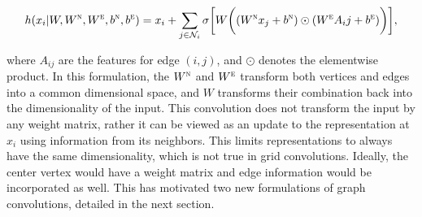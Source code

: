 \begin{equation}
h(x_i | W, W^\textsc{n}, W^\textsc{e}, b^\textsc{n}, b^\textsc{e})= x_i + \sum_{j \in \mathcal{N}_i} \sigma \bigg[ W \bigg( (W^\textsc{n} x_j + b^\textsc{n}) \odot (W^\textsc{e} A_ij + b^\textsc{e}) \bigg) \bigg],
\label{eq:deep_tensor}
\end{equation}

\noindent
where $A_{ij}$ are the features for edge $(i, j)$, and $\odot$ denotes the elementwise product.
In this formulation, the $W^\textsc{n}$ and $W^\textsc{e}$ transform both vertices and edges into a common dimensional space, and $W$ transforms their combination back into the dimensionality of the input. 
This convolution does not transform the input by any weight matrix, rather it can be viewed as an update to the representation at $x_i$ using information from its neighbors.
This limits representations to always have the same dimensionality, which is not true in grid convolutions. 
Ideally, the center vertex would have a weight matrix and edge information would be incorporated as well.
This has motivated two new formulations of graph convolutions, detailed in the next section.


